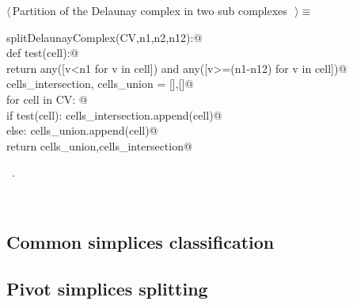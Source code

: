 \documentclass[11pt,oneside]{article}	%
\begin{document}
\begin{flushleft} \small
\begin{minipage}{\linewidth} \label{scrap15}
$\langle\,$Partition of the Delaunay complex in two sub complexes\nobreak\ {\footnotesize {}}$\,\rangle\equiv$
\vspace{-1ex}
\begin{list}{}{} \item
\mbox{}\verb@def splitDelaunayComplex(CV,n1,n2,n12):@\\
\mbox{}\verb@   def test(cell):@\\
\mbox{}\verb@      return any([v<n1 for v in cell]) and any([v>=(n1-n12) for v in cell])@\\
\mbox{}\verb@   cells_intersection, cells_union = [],[]@\\
\mbox{}\verb@   for cell in CV: @\\
\mbox{}\verb@      if test(cell): cells_intersection.append(cell)@\\
\mbox{}\verb@      else: cells_union.append(cell)@\\
\mbox{}\verb@   return cells_union,cells_intersection@\\
\mbox{}\verb@@{\NWsep}
\end{list}
\vspace{-1ex}
\footnotesize\addtolength{\baselineskip}{-1ex}
\begin{list}{}{\setlength{\itemsep}{-\parsep}\setlength{\itemindent}{-\leftmargin}}
\item \NWtxtMacroRefIn\ .
\end{list}
\end{minipage}\\[4ex]
\end{flushleft}




\subsection{Common simplices classification}
\subsection{Pivot simplices splitting}
\end{document}

